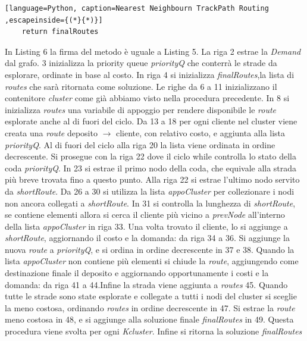 \documentclass[]{article}
\begin{document}
\begin{itemize}
\begin{lstlisting}[language=Python, caption=Nearest Neighbourn TrackPath Routing ,escapeinside={(*}{*)}]
	return finalRoutes
\end{lstlisting}
In Listing 6 la firma del metodo è uguale a Listing 5. La  riga 2 estrae la \textit{Demand} dal grafo.
3 inizializza la priority queue \textit{priorityQ} che conterrà le strade da esplorare, ordinate in base al costo. In riga 4 si inizializza \textit{finalRoutes},la lista di \emph{routes} che sarà ritornata come soluzione. Le righe da 6 a 11 inizializzano il contenitore \textit{cluster} come già abbiamo visto nella procedura precedente. In 8 si inizializza \textit{routes} una variabile di appoggio per rendere disponibile le \emph{route} esplorate anche al di fuori del ciclo. Da 13 a 18 per ogni cliente nel cluster viene creata una \emph{route} deposito $\rightarrow$ cliente, con relativo costo, e aggiunta alla lista \textit{priorityQ}.
Al di fuori del ciclo alla riga 20 la lista viene ordinata in ordine decrescente. Si prosegue con la riga 22 dove il ciclo while controlla lo stato della coda \textit{priorityQ}. In 23 si estrae il primo nodo della coda, che equivale alla strada più breve trovata fino a questo punto. Alla riga 22 si estrae l'ultimo nodo servito da \textit{shortRoute}. Da 26 a 30 si utilizza la lista \textit{appoCluster} per collezionare i nodi non ancora collegati a \textit{shortRoute}. In 31 si controlla la lunghezza di  \textit{shortRoute}, se contiene elementi allora si cerca il cliente più vicino a \textit{prevNode} all'interno della lista \textit{appoCluster} in riga 33. Una volta trovato il cliente, lo si aggiunge a \textit{shortRoute}, aggiornando il costo e la domanda: da riga 34 a 36. Si aggiunge la nuova \emph{route} a \textit{priorityQ}, e si ordina in ordine decrescente in 37 e 38.
Quando la lista \textit{appoCluster} non contiene più elementi si chiude la \emph{route}, aggiungendo come destinazione finale il deposito e aggiornando opportunamente i costi e la domanda: da riga 41 a 44.Infine la strada viene aggiunta a \textit{routes} 45. Quando tutte le strade sono state esplorate e collegate a tutti i nodi del cluster si sceglie la meno costosa, ordinando \textit{routes} in ordine decrescente in 47. Si  estrae la \emph{route} meno costosa in 48, e si aggiunge alla soluzione finale \textit{finalRoutes} in 49. Questa procedura viene svolta per ogni \textit{Kcluster}. Infine si ritorna la soluzione  \textit{finalRoutes}


\end{itemize}
\end{document}
